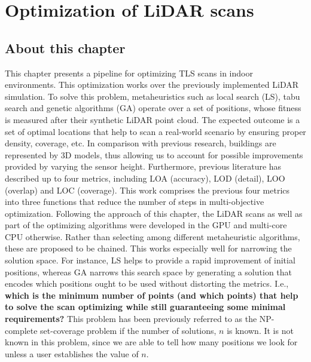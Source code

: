 \setchapterpreamble[u]{\margintoc}
\chapter{Optimization of LiDAR scans}
\label{sec:lidar_optimization}

\section*{About this chapter}

This chapter presents a pipeline for optimizing TLS scans in indoor environments. This optimization works over the previously implemented LiDAR simulation. To solve this problem, metaheuristics such as local search (LS), tabu search and genetic algorithms (GA) operate over a set of positions, whose fitness is measured after their synthetic LiDAR point cloud. The expected outcome is a set of optimal locations that help to scan a real-world scenario by ensuring proper density, coverage, etc. In comparison with previous research, buildings are represented by 3D models, thus allowing us to account for possible improvements provided by varying the sensor height. Furthermore, previous literature has described up to four metrics, including LOA (accuracy), LOD (detail), LOO (overlap) and LOC (coverage). This work comprises the previous four metrics into three functions that reduce the number of steps in multi-objective optimization. Following the approach of this chapter, the LiDAR scans as well as part of the optimizing algorithms were developed in the GPU and multi-core CPU otherwise. Rather than selecting among different metaheuristic algorithms, these are proposed to be chained. This works especially well for narrowing the solution space. For instance, LS helps to provide a rapid improvement of initial positions, whereas GA narrows this search space by generating a solution that encodes which positions ought to be used without distorting the metrics. I.e., \textbf{which is the minimum number of points (and which points) that help to solve the scan optimizing while still guaranteeing some minimal requirements?} This problem has been previously referred to as  the NP-complete set-coverage problem \cite{li_probability_2021, mohamadi_efficient_2021, roostapour_pareto_2022} if the number of solutions, $n$ is known. It is not known in this problem, since we are able to tell how many positions we look for unless a user establishes the value of $n$.

